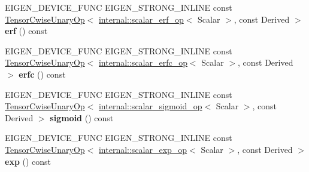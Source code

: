 \begin{DoxyCompactItemize}
\item 
\mbox{\label{class_eigen_1_1_tensor_base_3_01_derived_00_01_read_only_accessors_01_4_a761cf3a8c95faa71a427b0439ef23a28}} 
E\+I\+G\+E\+N\+\_\+\+D\+E\+V\+I\+C\+E\+\_\+\+F\+U\+NC E\+I\+G\+E\+N\+\_\+\+S\+T\+R\+O\+N\+G\+\_\+\+I\+N\+L\+I\+NE const \hyperlink{class_eigen_1_1_tensor_cwise_unary_op}{Tensor\+Cwise\+Unary\+Op}$<$ \hyperlink{struct_eigen_1_1internal_1_1scalar__erf__op}{internal\+::scalar\+\_\+erf\+\_\+op}$<$ Scalar $>$, const Derived $>$ {\bfseries erf} () const
\item 
\mbox{\label{class_eigen_1_1_tensor_base_3_01_derived_00_01_read_only_accessors_01_4_ac4b11964390999d78b493dac3981b7a4}} 
E\+I\+G\+E\+N\+\_\+\+D\+E\+V\+I\+C\+E\+\_\+\+F\+U\+NC E\+I\+G\+E\+N\+\_\+\+S\+T\+R\+O\+N\+G\+\_\+\+I\+N\+L\+I\+NE const \hyperlink{class_eigen_1_1_tensor_cwise_unary_op}{Tensor\+Cwise\+Unary\+Op}$<$ \hyperlink{struct_eigen_1_1internal_1_1scalar__erfc__op}{internal\+::scalar\+\_\+erfc\+\_\+op}$<$ Scalar $>$, const Derived $>$ {\bfseries erfc} () const
\item 
\mbox{\label{class_eigen_1_1_tensor_base_3_01_derived_00_01_read_only_accessors_01_4_a9993754df6295789e8e40dca88c8d37d}} 
E\+I\+G\+E\+N\+\_\+\+D\+E\+V\+I\+C\+E\+\_\+\+F\+U\+NC E\+I\+G\+E\+N\+\_\+\+S\+T\+R\+O\+N\+G\+\_\+\+I\+N\+L\+I\+NE const \hyperlink{class_eigen_1_1_tensor_cwise_unary_op}{Tensor\+Cwise\+Unary\+Op}$<$ \hyperlink{struct_eigen_1_1internal_1_1scalar__sigmoid__op}{internal\+::scalar\+\_\+sigmoid\+\_\+op}$<$ Scalar $>$, const Derived $>$ {\bfseries sigmoid} () const
\item 
\mbox{\label{class_eigen_1_1_tensor_base_3_01_derived_00_01_read_only_accessors_01_4_a7417739343a8a31b6fe71b22a4cd72a8}} 
E\+I\+G\+E\+N\+\_\+\+D\+E\+V\+I\+C\+E\+\_\+\+F\+U\+NC E\+I\+G\+E\+N\+\_\+\+S\+T\+R\+O\+N\+G\+\_\+\+I\+N\+L\+I\+NE const \hyperlink{class_eigen_1_1_tensor_cwise_unary_op}{Tensor\+Cwise\+Unary\+Op}$<$ \hyperlink{struct_eigen_1_1internal_1_1scalar__exp__op}{internal\+::scalar\+\_\+exp\+\_\+op}$<$ Scalar $>$, const Derived $>$ {\bfseries exp} () const
\item 

\end{DoxyCompactItemize}
